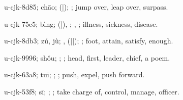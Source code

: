 \begin{multicols}{2}
{\cjkgGlue{}u-cjk-8d85; chāo; \cjkgGlue{}\cjkgGlue{}(\cjkgGlue{}|\cjkgGlue{}); \cjkgGlue{}; jump over, leap over, surpass.

\cjkgGlue{}u-cjk-75c5; bìng; \cjkgGlue{}\cjkgGlue{}(\cjkgGlue{}|\cjkgGlue{}), \cjkgGlue{}; \cjkgGlue{}, \cjkgGlue{}; illness, sickness, disease.

\cjkgGlue{}u-cjk-8db3; zú, jù; \cjkgGlue{}, \cjkgGlue{}\cjkgGlue{}(\cjkgGlue{}|\cjkgGlue{}|\cjkgGlue{}); \cjkgGlue{}; foot, attain, satisfy, enough.

\cjkgGlue{}u-cjk-9996; shǒu; \cjkgGlue{}; \cjkgGlue{}; head, first, leader, chief, a poem.

\cjkgGlue{}u-cjk-63a8; tuī; \cjkgGlue{}\cjkgGlue{}\cjkgGlue{}; \cjkgGlue{}; push, expel, push forward.

\cjkgGlue{}u-cjk-53f8; sī; \cjkgGlue{}\cjkgGlue{}\cjkgGlue{}; \cjkgGlue{}; take charge of, control, manage, officer.

}
\end{multicols}
